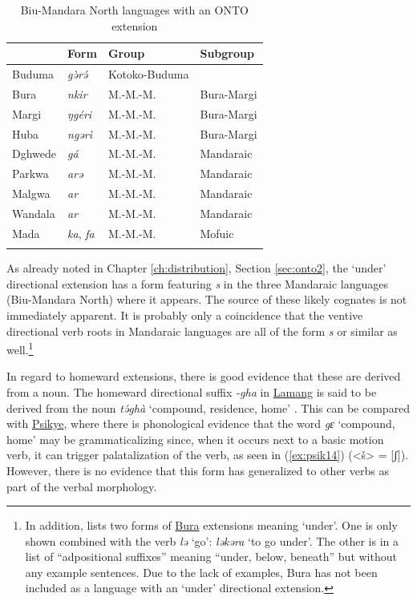 \begin{table}
	\caption{Biu-Mandara North languages with an ONTO extension}
	\label{tab:ontolang}
	\begin{tabular}{llll}
		\lsptoprule
		&     Form    &  Group & Subgroup         \\
		\midrule
		Buduma& \textit{gə̀rə́} & Kotoko-Buduma  & \\
		Bura& \textit{nkir} & M.-M.-M. & Bura-Margi \\
		Margi& \textit{ŋgéri} & M.-M.-M. & Bura-Margi \\
		Huba& \textit{ngərì} & M.-M.-M. & Bura-Margi \\
		Dghwede& \textit{gá} & M.-M.-M. & Mandaraic \\
		Parkwa& \textit{arə} & M.-M.-M. & Mandaraic \\
		Malgwa& \textit{ar} & M.-M.-M. & Mandaraic \\
		Wandala& \textit{ar} & M.-M.-M. & Mandaraic \\
		Mada& \textit{ka}, \textit{fa} & M.-M.-M. & Mofuic \\
		\lspbottomrule
	\end{tabular}
\end{table}

As already noted in Chapter \ref{ch:distribution}, Section \ref{sec:onto2}, the `under' directional extension has a form featuring \textit{s} in the three Mandaraic languages (Biu-Mandara North) where it appears. The source of these likely cognates is not immediately apparent. It is probably only a coincidence that the ventive directional verb roots in Mandaraic languages are all of the form \textit{s} or similar as well.\footnote{In addition, \citet[3]{blenchBuraVerbalExtensions2010} lists two forms of \hyperref[bura]{Bura} extensions meaning `under'. One is only shown combined with the verb \textit{lə} `go': \textit{ləkəra} `to go under'. The other is in a list of ``adpositional suffixes'' meaning ``under, below, beneath'' but without any example sentences. Due to the lack of examples, Bura has not been included as a language with an `under' directional extension.}

In regard to homeward extensions, there is good evidence that these are derived from a noun. The homeward directional suffix \textit{-gha} in \hyperref[lama]{Lamang} is said to be derived from the noun \textit{tə́ghà} `compound, residence, home' \citep[140]{wolffLamangLanguageDictionary2015}. This can be compared with \hyperref[psik]{Psikye}, where there is phonological evidence that the word \textit{gɛ} `compound, home' may be grammaticalizing since, when it occurs next to a basic motion verb, it can trigger palatalization of the verb, as seen in (\ref{ex:psik14}) (<š> = [ʃ]). However, there is no evidence that this form has generalized to other verbs as part of the verbal morphology. 

